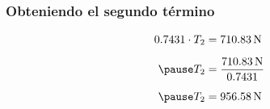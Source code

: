 \documentclass[12pt]{beamer}
\begin{document}
\begin{frame}
  \frametitle{Obteniendo el segundo término}
\begin{eqnarray*}
\begin{aligned}
0.7431 \cdot T_{2} &= \SI{710.83}{\newton} \\[0.5em] \pause
T_{2} &= \dfrac{\SI{710.83}{\newton}}{0.7431} \\[0.5em] \pause
T_{2} &= \SI{956.58}{\newton}
\end{aligned}
\end{eqnarray*}
\end{frame}
\end{document}
